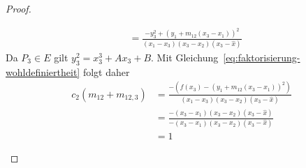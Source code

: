 \begin{proof}
\begin{enumerate}
\begin{align*}
                                       & =                       \frac{-y_3^2+{(y_1+ m_{12}(x_3-x_1))}^2}{(x_1-x_3)(x_3-x_2)(x_3-\hat{x})}
              \end{align*}
              Da $P_3\in E$ gilt $y_3^2=x_3^3+Ax_3+B$. Mit Gleichung~\eqref{eq:faktorisierung-wohldefiniertheit} folgt daher
              \begin{align*}
                  c_2(m_{12}+m_{12,3}) & = \frac{-\left(f(x_3)-{(y_1+m_{12}(x_3-x_1))}^2\right)}{(x_1-x_3)(x_3-x_2)(x_3-\hat{x})}        \\
                                       & =                     \frac{-(x_3-x_1)(x_3-x_2)(x_3-\hat{x})}{-(x_3-x_1)(x_3-x_2)(x_3-\hat{x})} \\
                                       & = 1
              \end{align*}


\end{enumerate}
\end{proof}
